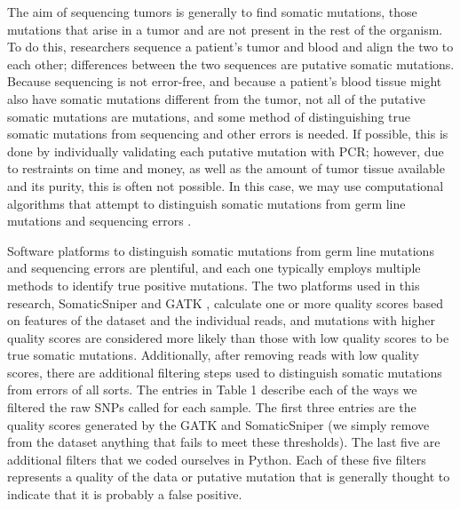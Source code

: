 \documentclass[11pt]{article} %
\begin{document}
The aim of sequencing tumors is generally to find somatic mutations, those mutations that arise in a tumor and are not present in the rest of the organism. To do this, researchers sequence a patient's tumor and blood and align the two to each other; differences between the two sequences are putative somatic mutations. Because sequencing is not error-free, and because a patient's blood tissue might also have somatic mutations different from the tumor, not all of the putative somatic mutations are mutations, and some method of distinguishing true somatic mutations from sequencing and other errors is needed. If possible, this is done by individually validating each putative mutation with PCR; however, due to restraints on time and money, as well as the amount of tumor tissue available and its purity, this is often not possible. In this case, we may use computational algorithms that attempt to distinguish somatic mutations from germ line mutations and sequencing errors \citep{SomaticSniper, mut_calling}. 

Software platforms to distinguish somatic mutations from germ line mutations and sequencing errors are plentiful, and each one typically employs multiple methods to identify true positive mutations. The two platforms used in this research, SomaticSniper \citep{SomaticSniper} and GATK \cite{GATK}, calculate one or more quality scores based on features of the dataset and the individual reads, and mutations with higher quality scores are considered more likely than those with low quality scores to be true somatic mutations. Additionally, after removing reads with low quality scores, there are additional filtering steps used to distinguish somatic mutations from errors of all sorts. The entries in Table 1 describe each of the ways we filtered the raw SNPs called for each sample. The first three entries are the quality scores generated by the GATK and SomaticSniper (we simply remove from the dataset anything that fails to meet these thresholds). The last five are additional filters that we coded ourselves in Python. Each of these five filters represents a quality of the data or putative mutation that is generally thought to indicate that it is probably a false positive.
\end{document}
